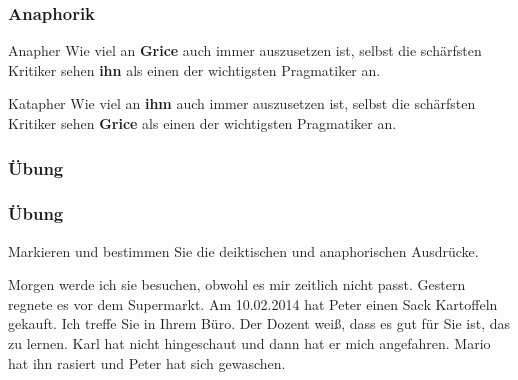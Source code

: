
\begin{frame}
\frametitle{Anaphorik}

	\begin{block}{Anapher}
		\ea Wie viel an \textbf{Grice} auch immer auszusetzen ist, selbst die schärfsten Kritiker sehen \textbf{ihn} als einen der wichtigsten Pragmatiker an.
		\z
	\end{block}
	

	\begin{block}{Katapher}
		\ea Wie viel an \textbf{ihm} auch immer auszusetzen ist, selbst die schärfsten Kritiker sehen \textbf{Grice} als einen der wichtigsten Pragmatiker an.
		\z
	\end{block}
	

\end{frame}


%
\subsubsection{Übung}
%

\begin{frame}
\frametitle{Übung}

	Markieren und bestimmen Sie die deiktischen und anaphorischen Ausdrücke.
	
	\ea \label{ex:08ue8} Morgen werde ich sie besuchen, obwohl es mir zeitlich nicht passt.
	\ex \label{ex:08ue9} Gestern regnete es vor dem Supermarkt.
	\ex \label{ex:08ue10}Am 10.02.2014 hat Peter einen Sack Kartoffeln gekauft.
	\ex \label{ex:08ue11}Ich treffe Sie in Ihrem Büro.
	\ex \label{ex:08ue12}Der Dozent wei\ss{}, dass es gut für Sie ist, das zu lernen.
	\ex \label{ex:08ue13}Karl hat nicht hingeschaut und dann hat er mich angefahren.
	\ex \label{ex:08ue14}Mario hat ihn rasiert und Peter hat sich gewaschen.
	\z
	

\end{frame}


